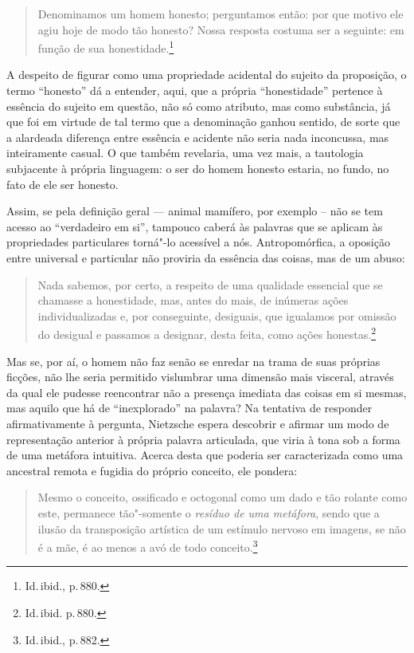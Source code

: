 \begin{quote}
Denominamos um homem honesto; perguntamos então: 
por que motivo ele agiu hoje de modo tão
honesto? Nossa resposta costuma ser a seguinte: em função de sua
honestidade.\footnote{ Id.\,ibid., p.\,880.}

\end{quote}
A despeito de
figurar como uma propriedade acidental do sujeito da proposição, o
termo “honesto” dá a entender, aqui, que a própria “honestidade”
pertence à essência do sujeito em questão, não só como atributo, mas
como substância, já que foi em virtude de tal termo que a denominação
ganhou sentido, de sorte que a alardeada diferença entre essência e
acidente não seria nada inconcussa, mas inteiramente casual. O que
também revelaria, uma vez mais, a tautologia subjacente à própria
linguagem: o ser do homem honesto estaria, no fundo, no fato de ele ser
honesto.

Assim, se pela definição geral --- animal mamífero, por exemplo -- não se
tem acesso ao “verdadeiro em si”, tampouco caberá às palavras
que se aplicam às propriedades particulares torná"-lo acessível a nós.
Antropomórfica, a oposição entre universal e particular não proviria da
essência das coisas, mas de um abuso: 

\begin{quote}
Nada sabemos, por
certo, a respeito de uma qualidade essencial que se chamasse a
honestidade, mas, antes do mais, de inúmeras ações individualizadas e,
por conseguinte, desiguais, que igualamos por omissão do desigual e
passamos a designar, desta feita, como ações
honestas.\footnote{ Id.\,ibid. p.\,880.}
\end{quote}

Mas se, por aí, o homem não faz senão se enredar na trama de suas
próprias ficções, não lhe seria permitido vislumbrar uma dimensão mais
visceral, através da qual ele pudesse reencontrar não a presença
imediata das coisas em si mesmas, mas aquilo que há de “inexplorado” na
palavra? Na tentativa de responder afirmativamente à pergunta,
Nietzsche espera descobrir e afirmar um modo de representação anterior
à própria palavra articulada, que viria à tona sob a forma de uma
metáfora intuitiva. Acerca desta que poderia ser caracterizada como uma
ancestral remota e fugidia do próprio conceito, ele pondera:

\begin{quote}
Mesmo o
conceito, ossificado e octogonal como um dado e tão rolante como este,
permanece tão"-somente o \textit{resíduo de uma metáfora}, sendo que a
ilusão da transposição artística de um estímulo nervoso em imagens, se
não é a mãe, é ao menos a avó de todo conceito.\footnote{ Id.\,ibid.,
p.\,882. }
\end{quote}


